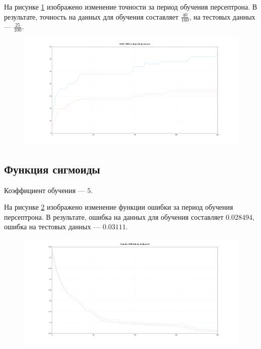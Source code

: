 \documentclass[a4paper, 14pt]{extarticle}
\begin{document}
На рисунке \ref{fig:relu_mse_accuracy} изображено изменение точности за период обучения персептрона. В результате, точность на данных для
обучения составляет $\frac{40}{160}$, на тестовых данных --- $\frac{25}{100}$.

\begin{figure}[!htb]
  \centering\includegraphics[width=\textwidth]{images/relu_mse_accuracy.png}
  \caption{}
  \label{fig:relu_mse_accuracy}
\end{figure}

\subsection{Функция сигмоиды}

Коэффициент обучения --- $5$.

На рисунке \ref{fig:sigmoid_mse_cost} изображено изменение функции ошибки за период обучения персептрона. В результате, ошибка на данных
для обучения составляет $0.028494$, ошибка на тестовых данных --- $0.03111$.

\begin{figure}[!htb]
  \centering\includegraphics[width=\textwidth]{images/sigmoid_mse_cost.png}
  \caption{}
  \label{fig:sigmoid_mse_cost}
\end{figure}
\end{document}
